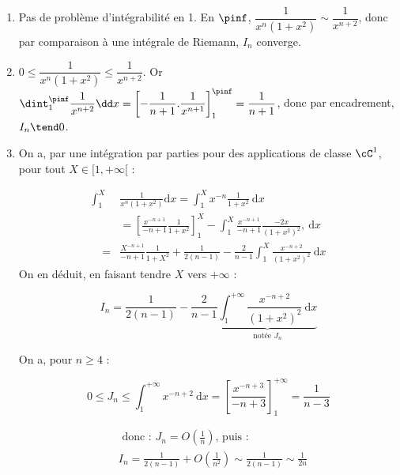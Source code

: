 \begin{enumerate}
\item Pas de problème d'intégrabilité en 1. En $\pinf$, $\dfrac1{x^n(1+x^2)}\sim\dfrac1{x^{n+2}}$, donc par comparaison à une intégrale de Riemann, $I_n$ converge.
\item $0\leq \dfrac1{x^n(1+x^2)}\leq \dfrac1{x^{n+2}}$. Or $\dint_1^{\pinf} \dfrac1{x^{n+2}}\dd x=\left[-\dfrac1{n+1}.\dfrac1{x^{n+1}}\right]_1^{\pinf}=\dfrac1{n+1}$, donc par encadrement, $I_n\tend 0$.
\item On a, par une intégration par parties pour des applications de classe $\cC^1$, pour tout $X \in[1,+\infty[$ :

$$
\begin{aligned}
\int_1^X & \frac{1}{x^n\left(1+x^2\right)} \mathrm{d} x=\int_1^X x^{-n} \frac{1}{1+x^2} \mathrm{~d} x \\
& =\left[\frac{x^{-n+1}}{-n+1} \frac{1}{1+x^2}\right]_1^X-\int_1^X \frac{x^{-n+1}}{-n+1} \frac{-2 x}{\left(1+x^2\right)^2}, \mathrm{~d} x \\
\quad= & \frac{X^{-n+1}}{-n+1} \frac{1}{1+X^2}+\frac{1}{2(n-1)}-\frac{2}{n-1} \int_1^X \frac{x^{-n+2}}{\left(1+x^2\right)^2} \mathrm{~d} x
\end{aligned}
$$
On en déduit, en faisant tendre $X$ vers $+\infty$ :

$$
I_n=\frac{1}{2(n-1)}-\frac{2}{n-1} \underbrace{\int_1^{+\infty} \frac{x^{-n+2}}{\left(1+x^2\right)^2} \mathrm{~d} x}_{\text {notée } J_n}
$$


On a, pour $n \geqslant 4$ :

$$
0 \leqslant J_n \leqslant \int_1^{+\infty} x^{-n+2} \mathrm{~d} x=\left[\frac{x^{-n+3}}{-n+3}\right]_1^{+\infty}=\frac{1}{n-3}
$$

$$
\begin{aligned}
&\text { donc : } J_n=O\left(\frac{1}{n}\right) \text {, puis : }\\
&I_n=\frac{1}{2(n-1)}+O\left(\frac{1}{n^2}\right) \sim \frac{1}{2(n-1)} \sim \frac{1}{2 n}
\end{aligned}
$$

\end{enumerate}
